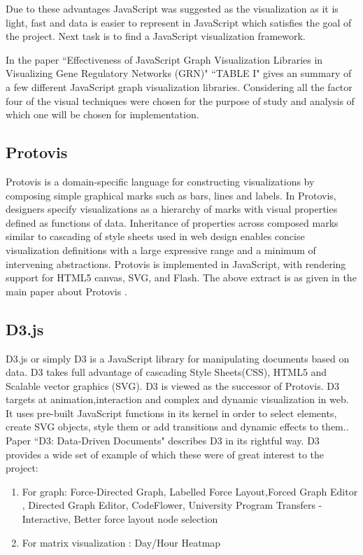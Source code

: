 Due to these advantages JavaScript was suggested as the visualization as it is light, fast and data is easier to represent in JavaScript which satisfies the goal of the project. Next task is to find a JavaScript visualization framework.  

\par In the paper ``Effectiveness of JavaScript Graph Visualization Libraries in Visualizing Gene Regulatory Networks (GRN)" \cite{graphjslib} ``TABLE I" gives an summary of a few different JavaScript graph visualization libraries. Considering all the factor four of the visual techniques were chosen for the purpose of study and analysis of which one will be chosen for implementation. 
\subsection{Protovis}
Protovis is a domain-specific
language for constructing visualizations by composing simple
graphical marks such as bars, lines and labels. In Protovis, designers
specify visualizations as a hierarchy of marks with visual properties
defined as functions of data. Inheritance of properties across
composed marks similar to cascading of style sheets used in web
design enables concise visualization definitions with a large expressive
range and a minimum of intervening abstractions. Protovis is implemented
in JavaScript, with rendering support for HTML5 canvas,
SVG, and Flash. The above extract is as given in the main paper about Protovis
\cite{protovis}.

\subsection{D3.js}
D3.js or simply D3 is a JavaScript library for manipulating documents based on data. D3 takes full advantage of cascading Style Sheets(CSS), HTML5 and Scalable vector graphics (SVG). D3 is viewed as the successor of Protovis. D3 targets at animation,interaction and complex and dynamic visualization in web.  It uses pre-built JavaScript
functions in its kernel in order to select elements, create SVG
objects, style them or add transitions and dynamic effects to
them.\cite{graphjslib}. Paper ``D3: Data-Driven Documents" \cite{d3} describes D3 in its rightful way. D3 provides a wide set of example of which these were of great interest to the project:
\begin{enumerate}
\item
For graph: Force-Directed Graph, Labelled Force Layout,Forced Graph Editor , Directed Graph Editor, CodeFlower, University Program Transfers - Interactive, Better force layout node selection
\item For matrix visualization : Day/Hour Heatmap
\end{enumerate}
